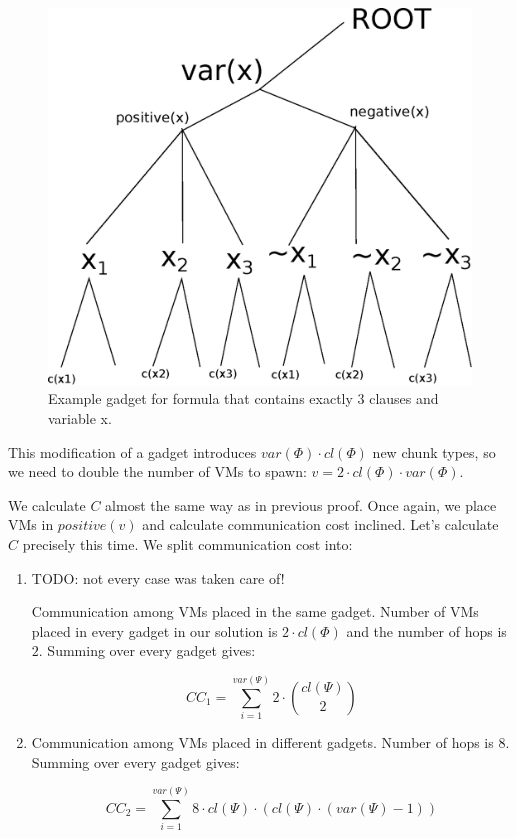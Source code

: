 \begin{figure}[htbp]
\includegraphics[width = \columnwidth]{figs/gadget-new.eps}
\caption{Example gadget for formula that contains exactly 3 clauses
and variable x.}
\label{fig:gadgets}
\end{figure}

This modification of a gadget introduces
$var(\Phi) \cdot cl(\Phi)$ new chunk types, so we need to double the number of VMs to
spawn: $v = 2 \cdot cl(\Phi)\cdot var(\Phi)$.


We calculate $C$ almost the same way as in previous proof. Once again,
we place VMs in $positive(v)$ and calculate communication cost
inclined. Let's calculate $C$ precisely this time. We split
communication cost into:
\begin{enumerate}
\item TODO: not every case was taken care of!

  Communication among VMs placed in the same gadget. Number of VMs
placed in every gadget in our solution is $2\cdot cl(\Phi)$ and the
number of hops is $2$. Summing over every gadget gives:

$$ CC_1 = \sum_{i=1}^{var(\Psi)}2\cdot {cl(\Psi) \choose 2} $$

\item Communication among VMs placed in different gadgets. Number of
hops is $8$. Summing over every gadget gives:

$$ CC_2 = \sum_{i=1}^{var(\Psi)} 8 \cdot cl(\Psi) \cdot (cl(\Psi) \cdot (var(\Psi) - 1))$$
\end{enumerate}

